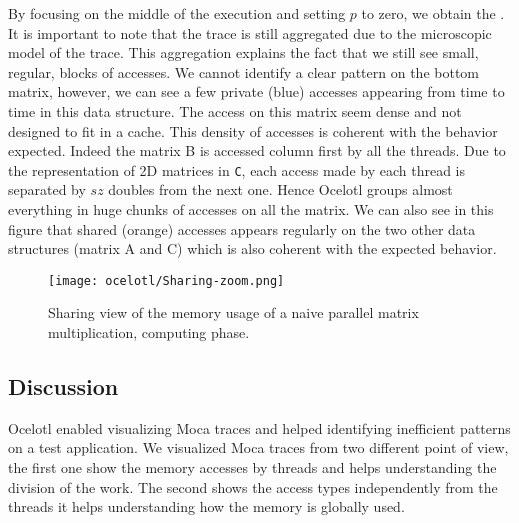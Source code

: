 By focusing on the middle of the execution and setting $p$ to zero, we obtain the .
It is important to note that the trace is still aggregated due to the microscopic model of the trace.
This aggregation explains the fact that we still see small, regular, blocks of accesses.
We cannot identify a clear pattern on the bottom matrix, however, we can see a few private (blue) accesses appearing from time to time in this data structure.
The access on this matrix seem dense and not designed to fit in a cache.
This density of accesses is coherent with the behavior expected.
Indeed the matrix B is accessed column first by all the threads.
Due to the representation of 2D matrices in \texttt{C}, each access made by each thread is separated by $sz$ doubles from the next one.
Hence \gls{Ocelotl} groups almost everything in huge chunks of accesses on all the matrix.
We can also see in this figure that shared (orange) accesses appears regularly on the two other data structures (matrix A and C) which is also coherent with the expected behavior.

\begin{figure}[htb]
    \centering
    \texttt{[image: ocelotl/Sharing-zoom.png]}
    \caption{Sharing view of the memory usage of a naive parallel matrix multiplication, computing phase.}
    \label{fig:ocelotl-Carto-zoom}
\end{figure}

\subsection{Discussion}

\gls{Ocelotl} enabled visualizing \gls{Moca} traces and helped identifying inefficient patterns on a test application.
We visualized \gls{Moca} traces from two different point of view, the first one show the memory accesses by threads and helps understanding the division of the work.
The second shows the access types independently from the threads it helps understanding how the memory is globally used.

